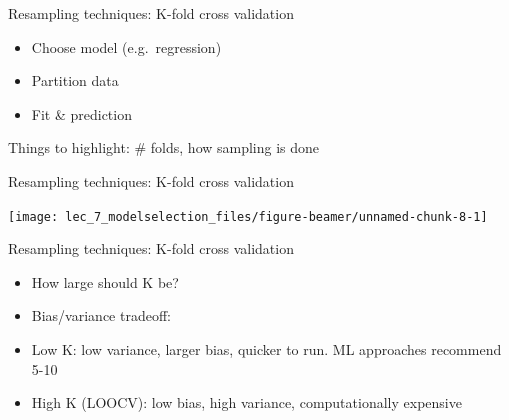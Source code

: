 \documentclass[ignorenonframetext,]{beamer}
\newenvironment{Shaded}{\begin{snugshade}}{\end{snugshade}}
\newcommand{\ControlFlowTok}[1]{\textcolor[rgb]{0.13,0.29,0.53}{\textbf{#1}}}
\newcommand{\DataTypeTok}[1]{\textcolor[rgb]{0.13,0.29,0.53}{#1}}
\newcommand{\DecValTok}[1]{\textcolor[rgb]{0.00,0.00,0.81}{#1}}
\newcommand{\KeywordTok}[1]{\textcolor[rgb]{0.13,0.29,0.53}{\textbf{#1}}}
\newcommand{\NormalTok}[1]{#1}
\newcommand{\OperatorTok}[1]{\textcolor[rgb]{0.81,0.36,0.00}{\textbf{#1}}}
\newcommand{\StringTok}[1]{\textcolor[rgb]{0.31,0.60,0.02}{#1}}
\providecommand{\tightlist}{%
  \setlength{\itemsep}{0pt}\setlength{\parskip}{0pt}}
\begin{document}
\begin{frame}[fragile]
\begin{block}{Resampling techniques: K-fold cross validation}
\begin{itemize}
\tightlist
\item
  Choose model (e.g.~regression)
\item
  Partition data
\item
  Fit \& prediction
\end{itemize}

Things to highlight: \# folds, how sampling is done

\begin{Shaded}
\end{Shaded}

\end{block}

\begin{block}{Resampling techniques: K-fold cross validation}

\begin{center}\texttt{[image: lec\_7\_modelselection\_files/figure-beamer/unnamed-chunk-8-1]} \end{center}

\end{block}

\begin{block}{Resampling techniques: K-fold cross validation}

\begin{itemize}
\item
  How large should K be?
\item
  Bias/variance tradeoff:
\item
  Low K: low variance, larger bias, quicker to run. ML approaches
  recommend 5-10
\item
  High K (LOOCV): low bias, high variance, computationally expensive
\end{itemize}


\end{block}
\end{frame}
\end{document}
